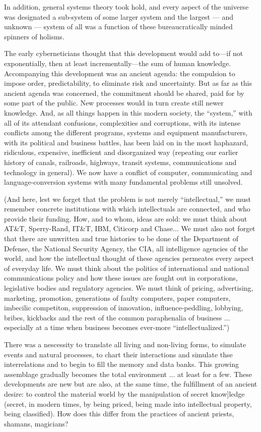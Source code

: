 \documentclass[11pt,twoside,draft]{memoir}
\begin{document}
In addition, general systems theory took
hold, and every aspect of the universe was
designated a sub-system of some larger system and the largest --- and unknown --- system
of all was a function of these bureaucratically
minded spinners of holisms.

The early cyberneticians thought that this
development would add to—if not exponentially, then at least incrementally—the sum of
human knowledge. Accompanying this development was an ancient agenda: the compulsion to impose order, predictability, to
eliminate risk and uncertainty. But as far as
this ancient agenda was concerned, the commitment should be shared, paid for by some
part of the public. New processes would in
turn create still newer knowledge. And, as all
things happen in this modern society, the
\enquote{system,}
with
all of its attendant
confusions, complexities and corruptions, with its
intense conflicts among the different programs, systems and equipment 
manufacturers, with its political and business battles, has
been laid on in the most haphazard, ridiculous, expensive, inefficient and disorganized
way (repeating our earlier history of canals,
railroads, highways, transit systems, communications and technology in general). We
now have a conflict of computer, communicating and language-conversion systems
with many fundamental problems still unsolved.


(And here, lest we forget that the problem
is not merely \enquote{intellectual,} we must remember concrete institutions with which
intellectuals are connected,
and who provide their funding. How, and to whom, ideas
are sold: we must think about AT\&T, Sperry-Rand, IT\&T, IBM, Citicorp and Chase... We
must also not forget that there are unwritten
and true histories to be done of the Department of Defense, the National Security Agency, the CIA, all intelligence agencies of the
world, and how the intellectual thought of
these agencies permeates every aspect of
everyday life. We must think about the politics of international and national communications policy and how these issues are
fought out in corporations, legislative bodies
and regulatory agencies. We must think of
pricing, advertising, marketing, promotion,
generations of faulty computers, paper computers, imbecilic
competiton, suppression of innovation, influence-peddling, lobbying,
bribes, kickbacks and the rest of the common
paraphenalia of business ... especially at a
time when business becomes ever-more
\enquote{intellectualized.})

There was a nescessity to translate all
living and non-living forms, to simulate
events and natural processes, to chart their
interactions and simulate thse interrelations
and to begin to fill the memory and data
banks. This growing assemblage gradually
becomes the total environment ... at least
for a few. These developments are new but
are also, at the same time, the fulfillment of
an ancient desire: to control the material
world by the manipulation of secret know]ledge (secret, in modern times, by being
priced, being made into intellectual property, being classified). How does this differ
from the practices of ancient priests, shamans, magicians?
\end{document}
